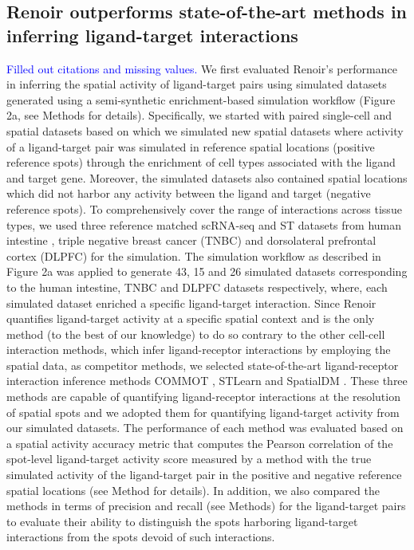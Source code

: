 \subsection*{Renoir outperforms state-of-the-art methods in inferring ligand-target interactions}
\textcolor{blue}{Filled out citations and missing values. }We first evaluated Renoir's performance in inferring the spatial activity of ligand-target pairs using simulated datasets generated using a semi-synthetic enrichment-based simulation workflow (Figure 2a, see Methods for details). Specifically, we started with paired single-cell and spatial datasets based on which we simulated new spatial datasets where activity of a ligand-target pair was simulated in reference spatial locations (positive reference spots) through the enrichment of cell types associated with the ligand and target gene. Moreover, the simulated datasets also contained spatial locations which did not harbor any activity between the ligand and target (negative reference spots). To comprehensively cover the range of interactions across tissue types, we used three reference matched scRNA-seq and ST datasets from human intestine \citep{FAWKNERCORBETT2021810}, triple negative breast cancer (TNBC) \citep{Wu2021} and dorsolateral prefrontal cortex (DLPFC) \citep{Maynard2021} for the simulation. The simulation workflow as described in Figure 2a was applied to generate 43, 15 and 26 simulated datasets corresponding to the human intestine, TNBC and DLPFC datasets respectively, where, each simulated dataset enriched a specific ligand-target interaction. Since Renoir quantifies ligand-target activity at a specific spatial context and is the only method (to the best of our knowledge) to do so contrary to the other cell-cell interaction methods, which infer ligand-receptor interactions by employing the spatial data, as competitor methods, we selected state-of-the-art ligand-receptor interaction inference methods COMMOT \citep{Cang2023}, STLearn \citep{Pham2023} and SpatialDM \citep{Li2023}. These three methods are capable of quantifying ligand-receptor interactions at the resolution of spatial spots and we adopted them for quantifying ligand-target activity from our simulated datasets. The performance of each method was evaluated based on a spatial activity accuracy metric that computes the Pearson correlation of the spot-level ligand-target activity score measured by a method with the true simulated activity of the ligand-target pair in the positive and negative reference spatial locations (see Method for details). In addition, we also compared the methods in terms of precision and recall (see Methods) for the ligand-target pairs to evaluate their ability to distinguish the spots harboring ligand-target interactions from the spots devoid of such interactions.\par 

